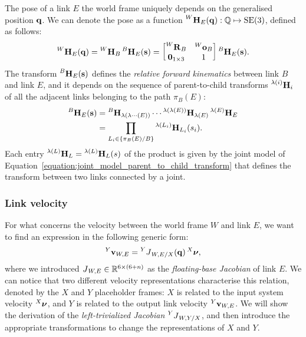 The pose of a link $E$ \wrtl the world frame uniquely depends on the generalised position $\Qu$.
We can denote the pose as a function $\homo[W]_E(\Qu): \mathbb{Q} \mapsto \SE(3)$, defined as follows:
%
\begin{equation}
    \label{eq:multibody_kinematics_pose}
    \homo[W]_E(\Qu) = \homo[W]_B \homo[B]_E(\Shape) =
    \begin{bmatrix}
        \rot[W]_B & \ori[W]_B \\
        \zeros_{1\times 3} & 1
    \end{bmatrix}
    \homo[B]_E(\Shape)
    .
\end{equation}
%
The transform $\homo[B]_E(\Shape)$ defines the \emph{relative forward kinematics} between link $B$ and link $E$, and it depends on the sequence of parent-to-child transforms $\homo[\lambda(i)]_{i}$ of all the adjacent links belonging to the path $\pi_B(E)$:
%
\begin{align*}
    \homo[B]_E(\Shape) &= \homo[B]_{\lambda(\lambda\cdots(E))} \cdots \homo[\lambda(\lambda(E))]_{\lambda(E)} \homo[\lambda(E)]_E \\
    &= \prod_{L_i \in \{\pi_B(E)/B\}} \homo[\lambda(L_i)]_{L_i}(s_i)
    .
\end{align*}
%
Each entry $\homo[\lambda(L)]_L = \homo[\lambda(L)]_L(\shape)$ of the product is given by the joint model of Equation~\eqref{equation:joint_model_parent_to_child_transform} that defines the transform between two links connected by a joint.

\subsubsection{Link velocity}

For what concerns the velocity between the world frame $W$ and link $E$, we want to find an expression in the following generic form:
%
\begin{equation*}
    \velsix[Y]_{W,E} = \jac[Y]_{W,E/X}(\Qu) \Nu[X]
    ,
\end{equation*}
%
where we introduced $\jac_{W,E} \in \realn^{6\times(6+n)}$ as the \emph{floating-base Jacobian} of link $E$.
We can notice that two different velocity representations characterise this relation, denoted by the $X$ and $Y$ placeholder frames: $X$ is related to the input system velocity $\Nu[X]$, and $Y$ is related to the output link velocity $\velsix[Y]_{W,E}$.
We will show the derivation of the \emph{left-trivialized Jacobian} $\jac[Y]_{W,Y/X}$, and then introduce the appropriate transformations to change the representations of $X$ and $Y$.

